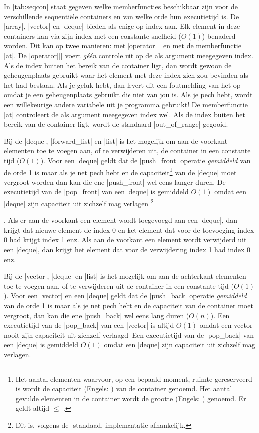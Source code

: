 \begin{cpplstShortInline}
In \cref{tab:seqcon} staat gegeven welke memberfuncties beschikbaar zijn voor de verschillende sequentiële containers en van welke orde hun executietijd is.
De |array|, |vector| en |deque| bieden als enige  op index aan.
Elk element in deze containers kan via zijn index met een constante snelheid ($O(1)$) benaderd worden.
Dit kan op twee manieren: met |operator[]| en met de memberfunctie |at|.
De |operator[]| voert \emph{géén} controle uit op de als argument meegegeven index.
Als de index buiten het bereik van de container ligt, dan wordt gewoon de geheugenplaats gebruikt waar het element met deze index zich zou bevinden als het had bestaan.
Als je geluk hebt, dan levert dit een foutmelding van het  op omdat je een geheugenplaats gebruikt die niet van jou is.
Als je pech hebt, wordt een willekeurige andere variabele uit je programma gebruikt!
De memberfunctie |at| controleert de als argument meegegeven index wel.
Als de index buiten het bereik van de container ligt, wordt de standaard  |out_of_range| gegooid.

Bij de |deque|, |forward_list| en |list| is het mogelijk om aan de voorkant elementen toe te voegen aan, of te verwijderen uit, de container in een constante tijd ($O(1)$).
Voor een |deque| geldt dat de |push_front| operatie \emph{gemiddeld} van de orde 1 is maar als je net pech hebt en de capaciteit\footnote{%
	Het aantal elementen waarvoor, op een bepaald moment, ruimte gereserveerd is wordt de capaciteit (Engels: ) van de container genoemd.
	Het aantal gevulde elementen in de container wordt de grootte (Engels: ) genoemd.
	Er geldt altijd  $\leq{}$ .
} van de |deque| moet vergroot worden dan kan die ene |push_front| wel eens langer duren.
De executietijd van de |pop_front| van een |deque| is gemiddeld $O(1)$ omdat een |deque| zijn capaciteit uit zichzelf mag verlagen%
\footnote{%
	Dit is, volgens de \Cpp{}\hyp{}standaad, implementatie afhankelijk.%
}\addtocounter{footnote}{-1}\addtocounter{Hfootnote}{-1}
.
Als er aan de voorkant een element wordt toegevoegd aan een |deque|, dan krijgt dat nieuwe element de index 0 en het element dat voor de toevoeging index 0 had krijgt index 1 enz.
Als aan de voorkant een element wordt verwijderd uit een |deque|, dan krijgt het element dat voor de verwijdering index 1 had index 0 enz.

Bij de |vector|, |deque| en |list| is het mogelijk om aan de achterkant elementen toe te voegen aan, of te verwijderen uit de container in een constante tijd ($O(1)$).
Voor een |vector| en een |deque| geldt dat de |push_back| operatie \emph{gemiddeld} van de orde 1 is maar als je net pech hebt en de capaciteit van de container moet vergroot, dan kan die ene |push_back| wel eens lang duren ($O(n)$).
Een executietijd van de |pop_back| van een |vector| is altijd $O(1)$ omdat een vector nooit zijn capaciteit uit zichzelf verlaagd.
Een executietijd van de |pop_back| van een |deque| is gemiddeld $O(1)$ omdat een |deque| zijn capaciteit uit zichzelf mag verlagen\footnotemark{}.


\end{cpplstShortInline}
